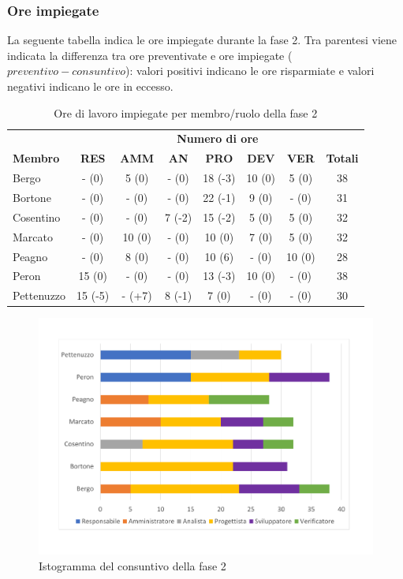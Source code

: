 	\subsubsection{Ore impiegate}
La seguente tabella indica le ore impiegate durante la fase 2. Tra parentesi viene indicata la differenza tra ore preventivate e ore impiegate ($preventivo - consuntivo$): valori positivi indicano le ore risparmiate e valori negativi indicano le ore in eccesso.

		\begin{table}[H]
			\centering
		\begin{tabular}{| l | c c c c c c | c |}
			\rowcolor{LightBlue}
			& \multicolumn{7}{c}{\textbf{\color{white}Numero di ore}}	\\
	
			\rowcolor{LightBlue}
			\textbf{\color{white}Membro}
			& \textbf{\color{white}RES}
			& \textbf{\color{white}AMM}
			& \textbf{\color{white}AN}
			& \textbf{\color{white}PRO}
			& \textbf{\color{white}DEV}
			& \textbf{\color{white}VER}
			& \textbf{\color{white}Totali}\\
			Bergo     		& -  (0)		& 5  (0) 	& -  (0) 		& 18 (-3) & 10 (0) & 5  (0) 	& 38\\
			Bortone   		& -  (0)		& -  (0) 	& -  (0) 		& 22 (-1) & 9 (0) & -  (0)	& 31\\
			Cosentino 		& -  (0)	 	& -  (0) 	& 7  (-2) 		& 15 (-2) & 5 (0) & 5  (0)	& 32\\
			Marcato   		& -  (0) 		& 10  (0) 	& -  (0) 		& 10 (0) & 7 (0) & 5  (0)	& 32\\
			Peagno    		& -  (0) 		& 8  (0) 	& -  (0) 		& 10 (6) & - (0) & 10  (0)	& 28\\
			Peron     		& 15  (0)		& -  (0) 	& -  (0) 		& 13 (-3) & 10 (0) & -  (0)	& 38\\
			Pettenuzzo 		& 15  (-5) 		& -  (+7) 	& 8 (-1) 		& 7 (0) & - (0) & -  (0)	& 30\\ \hline
		\end{tabular}
		\caption{Ore di lavoro impiegate per membro/ruolo della fase 2}
	\end{table}
	
	\begin{figure}[H]
		\centering
		\includegraphics[scale=0.45]{images/consuntivoRP.pdf}
		\caption{Istogramma del consuntivo della fase 2}
	\end{figure}
	
